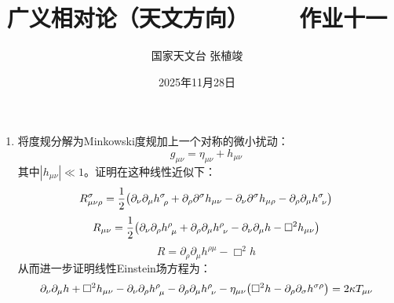 \documentclass[a4paper]{article}
\title{\textbf{广义相对论（天文方向）\ \ \ \ 作业十一}}
\author{国家天文台 张植竣}
\date{2025年11月28日}
\begin{document}
\maketitle

\begin{enumerate}
    \item 将度规分解为Minkowski度规加上一个对称的微小扰动：
    \[
        g_{\mu\nu} = \eta_{\mu\nu} + h_{\mu\nu}
    \]
    其中$|h_{\mu\nu}| \ll 1$。证明在这种线性近似下：
    \[
        R^\sigma_{\mu\nu\rho} = \frac{1}{2} \qty(\partial_\nu \partial_\mu h^\sigma_{\ \rho} + \partial_\rho \partial^\sigma h_{\mu\nu} - \partial_\nu \partial^\sigma h_{\mu\rho} - \partial_\rho \partial_\mu h^\sigma_{\ \nu})
    \]
    \[
        R_{\mu\nu} = \frac{1}{2} \qty(\partial_\nu \partial_\rho h^\rho_{\ \mu} + \partial_\rho \partial_\mu h^\rho_{\ \nu} - \partial_\nu \partial_\mu h - \Box^2 h_{\mu\nu})
    \]
    \[
        R = \partial_\rho \partial_\mu h^{\rho\mu} - \Box^2 h
    \]
    从而进一步证明线性Einstein场方程为：
    \[
        \partial_\nu \partial_\mu h + \Box^2 h_{\mu\nu} - \partial_\nu \partial_\rho h^\rho_{\ \mu} - \partial_\rho \partial_\mu h^\rho_{\ \nu} - \eta_{\mu\nu} \qty(\Box^2 h - \partial_\rho \partial_\sigma h^{\sigma\rho}) = 2\kappa T_{\mu\nu}
    \]


\end{enumerate}
\end{document}
